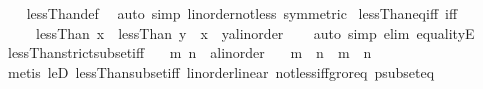 \begin{isabellebody}
%
\isadelimproof
\ \ %
\endisadelimproof
%
\isatagproof
{}\isamarkupfalse%
\ lessThan{\isacharunderscore}{\kern0pt}def\ \isamarkupfalse%
\ {\isacharparenleft}{\kern0pt}auto\ simp{\isacharcolon}{\kern0pt}\ linorder{\isacharunderscore}{\kern0pt}not{\isacharunderscore}{\kern0pt}less\ {\isacharbrackleft}{\kern0pt}symmetric{\isacharbrackright}{\kern0pt}{\isacharparenright}{\kern0pt}%
\endisatagproof
{\isafoldproof}%
%
\isadelimproof
\isanewline
%
\endisadelimproof
\isanewline
{}\isamarkupfalse%
\ lessThan{\isacharunderscore}{\kern0pt}eq{\isacharunderscore}{\kern0pt}iff\ {\isacharbrackleft}{\kern0pt}iff{\isacharbrackright}{\kern0pt}{\isacharcolon}{\kern0pt}\isanewline
\ \ \ \ \ {\isachardoublequoteopen}{\isacharparenleft}{\kern0pt}lessThan\ x\ {\isacharequal}{\kern0pt}\ lessThan\ y{\isacharparenright}{\kern0pt}\ {\isacharequal}{\kern0pt}\ {\isacharparenleft}{\kern0pt}x\ {\isacharequal}{\kern0pt}\ {\isacharparenleft}{\kern0pt}y{\isacharcolon}{\kern0pt}{\isacharcolon}{\kern0pt}{\isacharprime}{\kern0pt}a{\isacharcolon}{\kern0pt}{\isacharcolon}{\kern0pt}linorder{\isacharparenright}{\kern0pt}{\isacharparenright}{\kern0pt}{\isachardoublequoteclose}\isanewline
%
\isadelimproof
\ \ %
\endisadelimproof
%
\isatagproof
{}\isamarkupfalse%
\ {\isacharparenleft}{\kern0pt}auto\ simp{\isacharcolon}{\kern0pt}\ elim{\isacharbang}{\kern0pt}{\isacharcolon}{\kern0pt}\ equalityE{\isacharparenright}{\kern0pt}%
\endisatagproof
{\isafoldproof}%
%
\isadelimproof
\isanewline
%
\endisadelimproof
\isanewline
{}\isamarkupfalse%
\ lessThan{\isacharunderscore}{\kern0pt}strict{\isacharunderscore}{\kern0pt}subset{\isacharunderscore}{\kern0pt}iff{\isacharcolon}{\kern0pt}\isanewline
\ \ \ m\ n\ {\isacharcolon}{\kern0pt}{\isacharcolon}{\kern0pt}\ {\isachardoublequoteopen}{\isacharprime}{\kern0pt}a{\isacharcolon}{\kern0pt}{\isacharcolon}{\kern0pt}linorder{\isachardoublequoteclose}\isanewline
\ \ \ {\isachardoublequoteopen}{\isacharbraceleft}{\kern0pt}{\isachardot}{\kern0pt}{\isachardot}{\kern0pt}{\isacharless}{\kern0pt}m{\isacharbraceright}{\kern0pt}\ {\isacharless}{\kern0pt}\ {\isacharbraceleft}{\kern0pt}{\isachardot}{\kern0pt}{\isachardot}{\kern0pt}{\isacharless}{\kern0pt}n{\isacharbraceright}{\kern0pt}\ {\isasymlongleftrightarrow}\ m\ {\isacharless}{\kern0pt}\ n{\isachardoublequoteclose}\isanewline
%
\isadelimproof
\ \ %
\endisadelimproof
%
\isatagproof
{}\isamarkupfalse%
\ {\isacharparenleft}{\kern0pt}metis\ leD\ lessThan{\isacharunderscore}{\kern0pt}subset{\isacharunderscore}{\kern0pt}iff\ linorder{\isacharunderscore}{\kern0pt}linear\ not{\isacharunderscore}{\kern0pt}less{\isacharunderscore}{\kern0pt}iff{\isacharunderscore}{\kern0pt}gr{\isacharunderscore}{\kern0pt}or{\isacharunderscore}{\kern0pt}eq\ psubset{\isacharunderscore}{\kern0pt}eq{\isacharparenright}{\kern0pt}%

\end{isabellebody}

